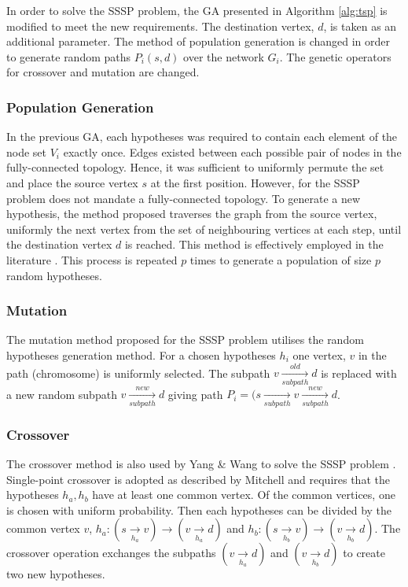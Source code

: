 \documentclass[
	a4paper, %
	10pt, %
	unnumberedsections, %
	twoside, %
]{LTJournalArticle}
\begin{document}
In order to solve the SSSP problem, the GA presented in Algorithm \ref{alg:tsp} is modified to meet the new requirements. The destination vertex, \(d\), is taken as an additional parameter. The method of population generation is changed in order to generate random paths \(P_{i} (s, d)\) over the network \(G_{i}\). The genetic operators for crossover and mutation are changed. \\

\subsubsection{Population Generation} In the previous GA, each hypotheses was required to contain each element of the node set \(V_{i}\) exactly once. Edges existed between each possible pair of nodes in the fully-connected topology. Hence, it was sufficient to uniformly permute the set and place the source vertex \(s\) at the first position. However, for the SSSP problem does not mandate a fully-connected topology.
To generate a new hypothesis, the method proposed traverses the graph from the source vertex, uniformly the next vertex from the set of neighbouring vertices at each step, until the destination vertex \(d\) is reached. This method is effectively employed in the literature \cite{yang:10} \cite{yussof:09} \cite{kumar:10}. This process is repeated \(p\) times to generate a population of size \(p\) random hypotheses. 

\subsubsection{Mutation} The mutation method proposed for the SSSP problem utilises the random hypotheses generation method. For a chosen hypotheses \(h_{i}\) one vertex, \(v\) in the path (chromosome) is uniformly selected. The subpath \(v \xrightarrow[subpath]{old} d\) is replaced with a new random subpath \(v \xrightarrow[subpath]{new} d\) giving path \(P_{i} = (s \xrightarrow[subpath]{} v \xrightarrow[subpath]{new} d\).  \\

\subsubsection{Crossover} The crossover method is also used by Yang \& Wang to solve the SSSP problem \cite{yang:10}. Single-point crossover is adopted as described by Mitchell \cite{mitchell:97} and requires that the hypotheses \(h_{a}, h_{b}\) have at least one common vertex. Of the common vertices, one is chosen with uniform probability. Then each hypotheses can be divided by the common vertex \(v\),  \(h_{a}: (s \xrightarrow[h_{a}]{} v) \rightarrow (v \xrightarrow[h_{a}]{} d)\) and \(h_{b}: (s \xrightarrow[h_{b}]{} v) \rightarrow (v \xrightarrow[h_{b}]{} d)\). The crossover operation exchanges the subpaths \((v \xrightarrow[h_{a}]{} d)\) and \((v \xrightarrow[h_{b}]{} d)\) to create two new hypotheses. \\
\end{document}
